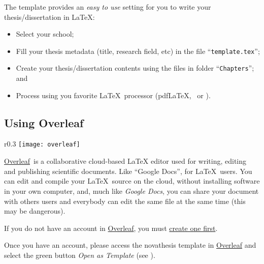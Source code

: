 The template provides an \emph{easy to use} setting for you to write your thesis/dissertation in \LaTeX:
\begin{itemize}
  \item  Select your school;
  \item Fill your thesis metadata (title, research field, etc) in the file “\texttt{template.tex}”;
  \item Create your thesis/dissertation contents using the files in folder “\texttt{Chapters}”; and
  \item Process using you favorite \LaTeX\ processor (pdf\LaTeX, \XeLaTeX\ or \LuaLaTeX).
\end{itemize}

\subsection{Using Overleaf}
\label{sub:using_overleaf}


\newcommand{\Overleaf}{\href{https://www.overleaf.com?r=f5160636&rm=d&rs=b}{Overleaf}}

\begin{wrapfigure}{r}{0.3\linewidth}
\texttt{[image: overleaf]}%
\caption{NOVAthesis template in Overleaf.}
\label{fig:overleaf}
\end{wrapfigure}
\mbox{}\Overleaf\ is a collaborative cloud-based LaTeX editor used for writing, editing and publishing scientific documents. Like “Google Docs”,  for \LaTeX\ users. You can edit and compile your \LaTeX\ source on the cloud, without installing software in your own computer, and, much like \emph{Google Docs}, you can share your document with others users and everybody can edit the same file at the same time (this may be dangerous).

If you do not have an account in \Overleaf, you must \href{https://www.overleaf.com?r=f5160636&rm=d&rs=b}{create one first}.

Once you have an account, please access the \gls{novathesis} template in \href{https://www.overleaf.com/latex/templates/novathesis-v7-dot-1-18/jhqwhtcwbmqc}{Overleaf} and select the green button \emph{Open as Template} (see ).

